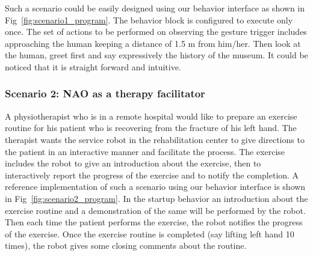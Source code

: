 \documentclass{llncs}
\begin{document}
%  
%                                         
 Such a scenario could be easily designed using our behavior interface as shown in Fig~\ref{fig:scenario1_program}. The behavior block is configured to execute only once. The set of actions to be performed on observing the gesture trigger includes approaching the human keeping a distance of 1.5 m from him/her. Then look at the human, greet first and say expressively the  history of the museum. It could be noticed that it is straight forward and intuitive.%

\subsubsection{Scenario 2: NAO as a therapy facilitator}%
A physiotherapist who is in a remote hospital would like to prepare an exercise routine for his patient who is recovering from the fracture of his left hand. The therapist wants the service robot in the rehabilitation center to give directions to the patient in an interactive manner and facilitate the process. The exercise includes the robot to give an introduction about the exercise, then to interactively report the progress of the exercise and to notify the completion. A reference implementation of such a scenario using our behavior interface is shown in Fig~\ref{fig:scenario2_program}. In the startup behavior an introduction about the exercise routine and a demonstration of the same will be performed by the robot. Then each time the patient performs the exercise, the robot notifies the progress of the exercise. Once the exercise routine is completed (say lifting left hand 10 times), the robot gives some closing comments about the routine.
\end{document}

